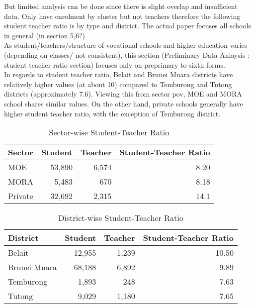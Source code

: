 \documentclass[12pt]{article}
\begin{document}
But limited analysis can be done since there is slight overlap and insufficient data. Only have enrolment by cluster but not teachers therefore the following student teacher ratio is by type and district. The actual paper focuses all schools in general (in section 5,6?) \\ 

As student/teachers/structure of vocational schools and higher education varies (depending on classes/ not consistent), this section (Preliminary Data Anlaysis : student teacher ratio section) focuses only on preprimary to sixth forms. \\

In regards to student teacher ratio, Belait and Brunei Muara districts have relatively higher values (at about 10) compared to Temburong and Tutong districts (approximately 7.6). Viewing this from sector pov, MOE and MORA school shares similar values. On the other hand, private schools generally have higher student teacher ratio, with the exception of Temburong district. 


\begin{table}[h!]
\centering
\setlength{\tabcolsep}{15pt} %
\begin{tabular}{lrrr}
\hline
\textbf{Sector} & \textbf{Student} & \textbf{Teacher} & \textbf{Student-Teacher Ratio} \\ 
\hline
MOE             & 53,890           & 6,574            & 8.20                           \\
MORA            & 5,483            & 670              & 8.18                           \\
Private         & 32,692           & 2,315            & 14.1                           \\
\hline
\end{tabular}
\caption{Sector-wise Student-Teacher Ratio}
\end{table}

\begin{table}[h!]
\centering
\setlength{\tabcolsep}{10pt}
\begin{tabular}{lrrr}
\hline
\textbf{District}   & \textbf{Student}  & \textbf{Teacher}  & \textbf{Student-Teacher Ratio} \\ 
\hline
Belait              & 12,955            & 1,239             & 10.50 \\
Brunei Muara        & 68,188            & 6,892             & 9.89 \\
Temburong           & 1,893             & 248               & 7.63 \\
Tutong              & 9,029             & 1,180             & 7.65 \\ 
\hline
\end{tabular}
\caption{District-wise Student-Teacher Ratio}
\end{table}
\end{document}
